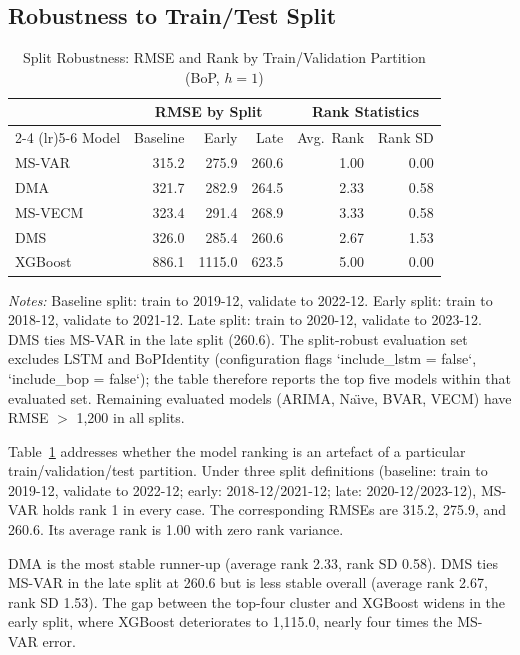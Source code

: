 \documentclass[12pt,a4paper]{article}
\begin{document}
\subsection{Robustness to Train/Test Split}

\begin{table}[htbp]
\centering
\caption{Split Robustness: RMSE and Rank by Train/Validation Partition (BoP, $h=1$)}
\label{tab:split_robustness}
\begin{tabular}{lrrr|rr}
\toprule
& \multicolumn{3}{c}{RMSE by Split} & \multicolumn{2}{c}{Rank Statistics} \\
\cmidrule(lr){2-4} \cmidrule(lr){5-6}
Model & Baseline & Early & Late & Avg.\ Rank & Rank SD \\
\midrule
MS-VAR & 315.2 & 275.9 & 260.6 & 1.00 & 0.00 \\
DMA & 321.7 & 282.9 & 264.5 & 2.33 & 0.58 \\
MS-VECM & 323.4 & 291.4 & 268.9 & 3.33 & 0.58 \\
DMS & 326.0 & 285.4 & 260.6 & 2.67 & 1.53 \\
XGBoost & 886.1 & 1115.0 & 623.5 & 5.00 & 0.00 \\
\bottomrule
\end{tabular}
\begin{tablenotes}
\small
\item \textit{Notes:} Baseline split: train to 2019-12, validate to 2022-12. Early split: train to 2018-12, validate to 2021-12. Late split: train to 2020-12, validate to 2023-12. DMS ties MS-VAR in the late split (260.6). The split-robust evaluation set excludes LSTM and BoPIdentity (configuration flags `include\_lstm = false`, `include\_bop = false`); the table therefore reports the top five models within that evaluated set. Remaining evaluated models (ARIMA, Na\"{\i}ve, BVAR, VECM) have RMSE $>$ 1,200 in all splits.
\end{tablenotes}
\end{table}

Table~\ref{tab:split_robustness} addresses whether the model ranking is an artefact of a particular train/validation/test partition. Under three split definitions (baseline: train to 2019-12, validate to 2022-12; early: 2018-12/2021-12; late: 2020-12/2023-12), MS-VAR holds rank 1 in every case. The corresponding RMSEs are 315.2, 275.9, and 260.6. Its average rank is 1.00 with zero rank variance.

DMA is the most stable runner-up (average rank 2.33, rank SD 0.58). DMS ties MS-VAR in the late split at 260.6 but is less stable overall (average rank 2.67, rank SD 1.53). The gap between the top-four cluster and XGBoost widens in the early split, where XGBoost deteriorates to 1,115.0, nearly four times the MS-VAR error.
\end{document}
